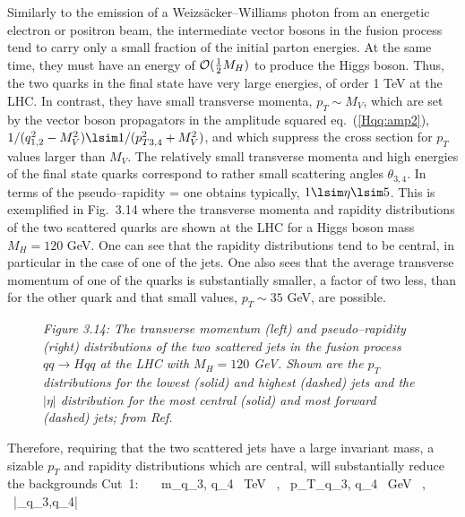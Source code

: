 Similarly to the emission of a Weizs\"acker--Williams photon from an energetic  
electron or positron beam, the intermediate vector bosons in the fusion
process tend to carry only a small fraction of the initial parton energies. At
the same time, they must have an energy of ${\cal O}(\frac{1}{2}M_H)$ to 
produce the Higgs boson. Thus, the two quarks in the final state have very large
energies, of order 1 TeV at the LHC. In contrast, they have small transverse 
momenta, $p_{T} \sim M_V$, which are set by the vector boson propagators in 
the amplitude squared eq.~(\ref{Hqq:amp2}), $1/(q_{1,2}^2 -M_V^2) \lsim 1/
(p_{T3,4}^2 +M_V^2)$, and which suppress the cross section for $p_T$ values 
larger than $M_V$. The relatively small transverse momenta and high energies of
the final state quarks correspond to rather small scattering angles 
$\theta_{3,4}$. In terms of  the pseudo--rapidity
\beq
 \eta =  \log {} 
\eeq
one obtains typically, $1 \lsim \eta \lsim 5$.  This is exemplified in
Fig.~3.14 where the transverse momenta and rapidity distributions of the two
scattered quarks are shown at the LHC for a Higgs boson mass $M_H=120$ GeV. One
can see that the rapidity distributions tend to be central, in particular in
the case of one of the jets. One also sees that the average transverse
momentum of one of the quarks  is substantially smaller,  a factor of two less,
than for the other quark and that small values, $p_T \sim 35$ GeV, are 
possible.\s

\begin{figure}[!h]
\begin{center}
\leavevmode
{}
\vspace*{-5mm}
\end{center}
{\it Figure 3.14: The transverse momentum (left) and pseudo--rapidity (right)
distributions of the two scattered jets in the fusion process $qq \to Hqq$ at
the LHC with $M_H=120$ GeV. Shown are the $p_T$ distributions for the lowest
(solid) and highest (dashed) jets and the $|\eta|$ distribution for the most 
central (solid) and most forward (dashed) jets; from Ref.~\cite{Zepp-review}}
\vspace*{-3mm}
\end{figure}

Therefore, requiring that the two scattered jets have a large invariant 
mass, a sizable $p_T$ and  rapidity distributions which are central, 
will substantially reduce the backgrounds
\beq
{\rm Cut~1}: \ \ \ m_{q_3, q_4} ~{\rm TeV} \ , \ p_{T_{q_3, q_4}} 
~{\rm GeV} \ , \ |\eta_{q_3,q_4}|   
\eeq

